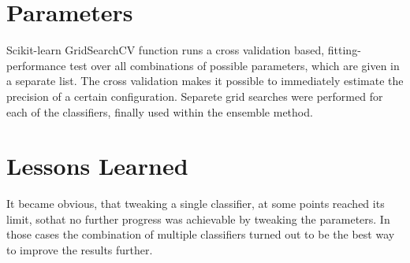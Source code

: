 \documentclass[a4paper, 11pt]{article}
\begin{document}
\section{Parameters}
Scikit-learn GridSearchCV function runs a cross validation based, fitting-performance test over all combinations of possible parameters, which are given in a separate list. The cross validation makes it possible to immediately estimate the precision of a certain configuration. Separete grid searches were performed for each of the classifiers, finally used within the ensemble method. 

\section{Lessons Learned} 
It became obvious, that tweaking a single classifier, at some points reached its limit, sothat no further progress was achievable by tweaking the parameters. In those cases the combination of multiple classifiers turned out to be the best way to improve the results further. 
\end{document}
